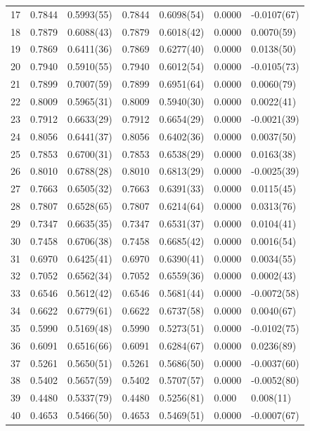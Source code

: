 \documentclass[aps, prc, tightenlines,superscriptaddress, letterpaper, amsmath, amssymb, preprintnumbers, floatfix, longbibliography, nofootinbib]{revtex4-2}
\begin{document}
\begin{table}[!htb]
{\begin{tabularx}{\textwidth}{| c || Y | Y | Y | Y | Y | Y |}
17	&	0.7844	&	0.5993(55)	&	0.7844	&	0.6098(54)	&	0.0000	&	-0.0107(67)	\\
18	&	0.7879	&	0.6088(43)	&	0.7879	&	0.6018(42)	&	0.0000	&	0.0070(59)	\\
19	&	0.7869	&	0.6411(36)	&	0.7869	&	0.6277(40)	&	0.0000	&	0.0138(50)	\\
20	&	0.7940	&	0.5910(55)	&	0.7940	&	0.6012(54)	&	0.0000	&	-0.0105(73)	\\
21	&	0.7899	&	0.7007(59)	&	0.7899	&	0.6951(64)	&	0.0000	&	0.0060(79)	\\
22	&	0.8009	&	0.5965(31)	&	0.8009	&	0.5940(30)	&	0.0000	&	0.0022(41)	\\
23	&	0.7912	&	0.6633(29)	&	0.7912	&	0.6654(29)	&	0.0000	&	-0.0021(39)	\\
24	&	0.8056	&	0.6441(37)	&	0.8056	&	0.6402(36)	&	0.0000	&	0.0037(50)	\\
25	&	0.7853	&	0.6700(31)	&	0.7853	&	0.6538(29)	&	0.0000	&	0.0163(38)	\\
26	&	0.8010	&	0.6788(28)	&	0.8010	&	0.6813(29)	&	0.0000	&	-0.0025(39)	\\
27	&	0.7663	&	0.6505(32)	&	0.7663	&	0.6391(33)	&	0.0000	&	0.0115(45)	\\
28	&	0.7807	&	0.6528(65)	&	0.7807	&	0.6214(64)	&	0.0000	&	0.0313(76)	\\
29	&	0.7347	&	0.6635(35)	&	0.7347	&	0.6531(37)	&	0.0000	&	0.0104(41)	\\
30	&	0.7458	&	0.6706(38)	&	0.7458	&	0.6685(42)	&	0.0000	&	0.0016(54)	\\
31	&	0.6970	&	0.6425(41)	&	0.6970	&	0.6390(41)	&	0.0000	&	0.0034(55)	\\
32	&	0.7052	&	0.6562(34)	&	0.7052	&	0.6559(36)	&	0.0000	&	0.0002(43)	\\
33	&	0.6546	&	0.5612(42)	&	0.6546	&	0.5681(44)	&	0.0000	&	-0.0072(58)	\\
34	&	0.6622	&	0.6779(61)	&	0.6622	&	0.6737(58)	&	0.0000	&	0.0040(67)	\\
35	&	0.5990	&	0.5169(48)	&	0.5990	&	0.5273(51)	&	0.0000	&	-0.0102(75)	\\
36	&	0.6091	&	0.6516(66)	&	0.6091	&	0.6284(67)	&	0.0000	&	0.0236(89)	\\
37	&	0.5261	&	0.5650(51)	&	0.5261	&	0.5686(50)	&	0.0000	&	-0.0037(60)	\\
38	&	0.5402	&	0.5657(59)	&	0.5402	&	0.5707(57)	&	0.0000	&	-0.0052(80)	\\
39	&	0.4480	&	0.5337(79)	&	0.4480	&	0.5256(81)	&	0.000	&	0.008(11)	\\
40	&	0.4653	&	0.5466(50)	&	0.4653	&	0.5469(51)	&	0.0000	&	-0.0007(67)	\\

\end{tabularx}}
\end{table}
\end{document}
